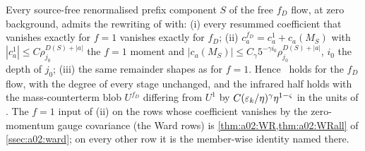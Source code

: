 \begin{theorem}\label{thm:a02:T}
Every source-free renormalised prefix component $S$ of the free $f_D$ flow, at zero background, admits the rewriting of \cite[Sect.~3]{Ba3} with: (i) every resummed coefficient that vanishes exactly for $f=1$ vanishes exactly for $f_D$; (ii) $c_a^{f_D}=c_a^1+c_a(M_S)$ with $|c_a^1|\le C\rho_{j_0}^{D(S)+|a|}$ the $f=1$ moment and $|c_a(M_S)|\le C_\gamma5^{-\gamma i_0}\rho_{j_0}^{D(S)+|a|}$, $i_0$ the depth of $j_0$; (iii) the same remainder shapes as for $f=1$. Hence \DEG\ holds for the $f_D$ flow, with the degree of every stage unchanged, and the infrared half \cite[(3.78)]{K1} holds with the mass-counterterm blob $U^{f_D}$ differing from $U^1$ by $C(\varepsilon_k/\eta)^\gamma\eta^{1-\varsigma}$ in the units of \cite[(3.78)]{K1}. The $f=1$ input of (ii) on the rows whose coefficient vanishes by the zero-momentum gauge covariance (the Ward rows) is \cref{thm:a02:WR,thm:a02:WRall} of \cref{ssec:a02:ward}; on every other row it is the member-wise identity named there.
\end{theorem}
